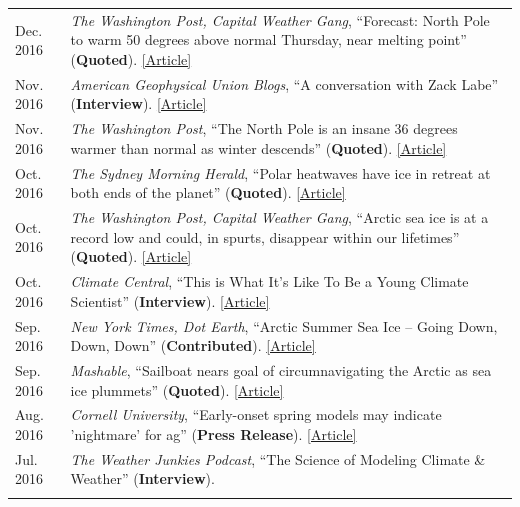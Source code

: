 \documentclass[margin,line,palatino,courier,10pt]{res}
\begin{document}
\begin{resume}
\begin{tabular}{@{}p{0.9in}p{4in}}
Dec. 2016 & \textit{The Washington Post, Capital Weather Gang}, ``Forecast: North Pole to warm 50 degrees above normal Thursday, near melting point'' (\textbf{Quoted}). \href{https://www.washingtonpost.com/news/capital-weather-gang/wp/2016/12/20/forecast-north-pole-to-warm-50-degrees-above-normal-thursday-near-melting-point/?dfgdfgdfgdfg&utm_term=.e648369ada7e}{[Article]}\\
Nov. 2016 & \textit{American Geophysical Union Blogs}, ``A conversation with Zack Labe'' (\textbf{Interview}). \href{http://blogs.agu.org/mountainbeltway/2016/11/23/conversation-zack-labe/}{[Article]}\\
Nov. 2016 & \textit{The Washington Post}, ``The North Pole is an insane 36 degrees warmer than normal as winter descends'' (\textbf{Quoted}). \href{https://www.washingtonpost.com/news/energy-environment/wp/2016/11/17/the-north-pole-is-an-insane-36-degrees-warmer-than-normal-as-winter-descends/?utm_term=.f2cb9596b3d8}{[Article]}\\
Oct. 2016 & \textit{The Sydney Morning Herald}, ``Polar heatwaves have ice in retreat at both ends of the planet'' (\textbf{Quoted}). \href{http://www.smh.com.au/environment/climate-change/polar-heatwaves-have-ice-in-retreat-at-both-ends-of-the-planet-20161030-gse9q6.html}{[Article]}\\
Oct. 2016 & \textit{The Washington Post, Capital Weather Gang}, ``Arctic sea ice is at a record low and could, in spurts, disappear within our lifetimes'' (\textbf{Quoted}). \href{https://www.washingtonpost.com/news/capital-weather-gang/wp/2016/10/27/arctic-sea-ice-is-at-a-record-low-and-could-in-spurts-disappear-within-our-lifetimes/}{[Article]}\\
Oct. 2016 & \textit{Climate Central}, ``This is What It's Like To Be a Young Climate Scientist'' (\textbf{Interview}). \href{http://www.climatecentral.org/news/young-climate-scientists-interviews-20799}{[Article]}\\
Sep. 2016 & \textit{New York Times, Dot Earth}, ``Arctic Summer Sea Ice -- Going Down, Down, Down'' (\textbf{Contributed}). \href{http://dotearth.blogs.nytimes.com/2016/09/16/arctic-summer-sea-ice-going-down-down-down/?module=BlogPost-ReadMore&version=Blog\%20Main&action=Click&contentCollection=arctic&pgtype=Blogs&region=Body&_r=1#more-58318}{[Article]}\\
Sep. 2016 & \textit{Mashable}, ``Sailboat nears goal of circumnavigating the Arctic as sea ice plummets'' (\textbf{Quoted}). \href{http://mashable.com/2016/09/01/sailboat-arctic-ice-melt-open-water/#s7nzft8m6sqB}{[Article]}\\
Aug. 2016 & \textit{Cornell University}, ``Early-onset spring models may indicate 'nightmare' for ag'' (\textbf{Press Release}). \href{http://www.news.cornell.edu/stories/2016/08/early-onset-spring-models-may-indicate-nightmare-ag}{[Article]}\\
Jul. 2016 & \textit{The Weather Junkies Podcast}, ``The Science of Modeling Climate \& Weather'' (\textbf{Interview}). \\\\


\end{tabular}
\end{resume}
\end{document}
